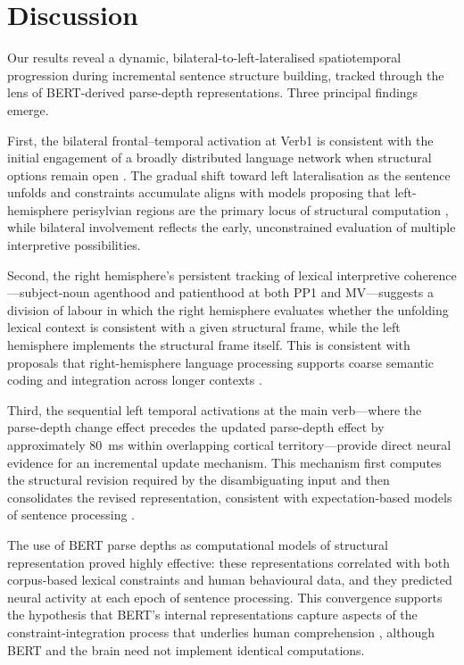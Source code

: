 \documentclass[11pt]{article}
\begin{document}
\section{Discussion}

Our results reveal a dynamic, bilateral-to-left-lateralised spatiotemporal progression during incremental sentence structure building, tracked through the lens of BERT-derived parse-depth representations. Three principal findings emerge.

First, the bilateral frontal--temporal activation at Verb1 is consistent with the initial engagement of a broadly distributed language network when structural options remain open \citep{friederici2011brain, hagoort2014muc}. The gradual shift toward left lateralisation as the sentence unfolds and constraints accumulate aligns with models proposing that left-hemisphere perisylvian regions are the primary locus of structural computation \citep{hickok2007cortical, fedorenko2016neural, pylkkanen2019neural}, while bilateral involvement reflects the early, unconstrained evaluation of multiple interpretive possibilities.

Second, the right hemisphere's persistent tracking of lexical interpretive coherence---subject-noun agenthood and patienthood at both PP1 and MV---suggests a division of labour in which the right hemisphere evaluates whether the unfolding lexical context is consistent with a given structural frame, while the left hemisphere implements the structural frame itself. This is consistent with proposals that right-hemisphere language processing supports coarse semantic coding and integration across longer contexts \citep{hagoort2014muc}.

Third, the sequential left temporal activations at the main verb---where the parse-depth change effect precedes the updated parse-depth effect by approximately 80~ms within overlapping cortical territory---provide direct neural evidence for an incremental update mechanism. This mechanism first computes the structural revision required by the disambiguating input and then consolidates the revised representation, consistent with expectation-based models of sentence processing \citep{hale2001probabilistic, levy2008expectation}.

The use of BERT parse depths as computational models of structural representation proved highly effective: these representations correlated with both corpus-based lexical constraints and human behavioural data, and they predicted neural activity at each epoch of sentence processing. This convergence supports the hypothesis that BERT's internal representations capture aspects of the constraint-integration process that underlies human comprehension \citep{schrimpf2021neural, caucheteux2022brains}, although BERT and the brain need not implement identical computations.
\end{document}

